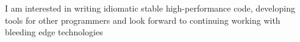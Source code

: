 I am interested in writing idiomatic stable high-performance code, developing tools for other programmers and look forward to continuing working with bleeding edge technologies
